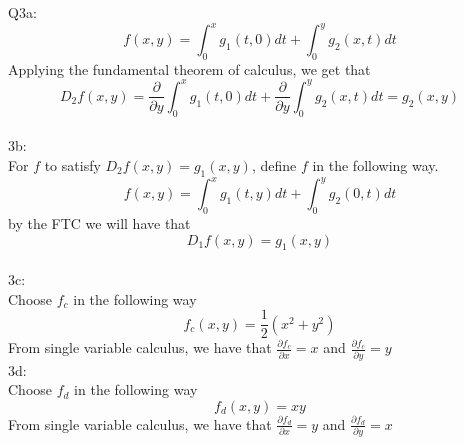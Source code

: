 \documentclass[letterpaper]{article}
\begin{document}
Q3a:$$f(x,y) = \int_0^x g_1(t,0)dt + \int_0^y g_2(x,t) dt$$
Applying the fundamental theorem of calculus, we get that $$D_2f(x,y) = \frac{\partial}{\partial y} \int_0^x g_1(t,0)dt + \frac{\partial}{\partial y} \int_0^y g_2(x,t) dt = g_2(x,y) $$
\\ 3b: \\
For $f$ to satisfy $D_2f(x,y) = g_1(x,y)$, define $f$ in the following way. $$f(x,y) = \int_0^x g_1(t,y) dt + \int_0^y g_2(0,t) dt$$ by the FTC we will have that $$D_1f(x,y) = g_1(x,y)$$
\\ 3c: \\
Choose $f_c$ in the following way $$f_c(x,y) = \frac{1}{2}(x^2+y^2)$$ From single variable calculus, we have that $\frac{\partial f_c}{\partial x} = x$ and $\frac{\partial f_c}{\partial y} = y$
\\ 3d:\\
Choose $f_d$ in the following way $$f_d(x,y) = xy$$ From single variable calculus, we have that $\frac{\partial f_d}{\partial x} = y$ and $\frac{\partial f_d}{\partial y} = x$
\end{document}
